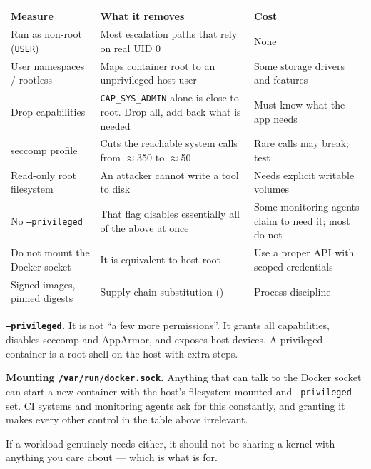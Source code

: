 \begin{longtable}{@{}L{4.0cm}L{5.2cm}L{5.0cm}@{}}
\toprule
{}
\textbf{Measure} & \textbf{What it removes} & \textbf{Cost} \\
\midrule
\endhead
Run as non-root (\texttt{USER}) & Most escalation paths that rely on real UID 0
& None \\
User namespaces / rootless & Maps container root to an unprivileged host user &
Some storage drivers and features \\
Drop capabilities & \texttt{CAP\_SYS\_ADMIN} alone is close to root. Drop all,
add back what is needed & Must know what the app needs \\
seccomp profile & Cuts the reachable system calls from $\approx$350 to
$\approx$50 & Rare calls may break; test \\
Read-only root filesystem & An attacker cannot write a tool to disk & Needs
explicit writable volumes \\
No \texttt{--privileged} & That flag disables essentially all of the above at
once & Some monitoring agents claim to need it; most do not \\
Do not mount the Docker socket & It is equivalent to host root & Use a proper
API with scoped credentials \\
Signed images, pinned digests & Supply-chain substitution () &
Process discipline \\
\bottomrule
\end{longtable}

\begin{alertbox}
\textbf{\texttt{--privileged}.} It is not ``a few more permissions''. It grants
all capabilities, disables seccomp and AppArmor, and exposes host devices. A
privileged container is a root shell on the host with extra steps.

\smallskip
\textbf{Mounting \texttt{/var/run/docker.sock}.} Anything that can talk to the
Docker socket can start a new container with the host's filesystem mounted and
\texttt{--privileged} set. CI systems and monitoring agents ask for this
constantly, and granting it makes every other control in the table above
irrelevant.

\smallskip
If a workload genuinely needs either, it should not be sharing a kernel with
anything you care about --- which is what  is for.
\end{alertbox}


